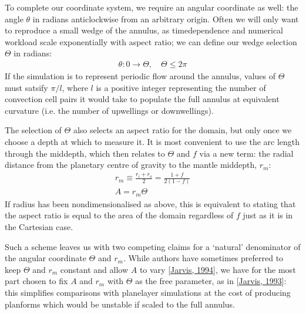 \documentclass[letterpaper,10pt,english]{jupyterBook}
\begin{document}
\sphinxAtStartPar
To complete our coordinate system, we require an angular coordinate as well: the angle \(\theta\) in radians anticlockwise from an arbitrary origin. Often we will only want to reproduce a small wedge of the annulus, as time\sphinxhyphen{}dependence and numerical workload scale exponentially with aspect ratio; we can define our wedge selection \(\Theta\) in radians:
\begin{equation*}
\begin{split} \theta: 0 \to \Theta, \quad \Theta \leq 2\pi \end{split}
\end{equation*}
\sphinxAtStartPar
If the simulation is to represent periodic flow around the annulus, values of \(\Theta\) must satsify \(\pi / l\), where \(l\) is a positive integer representing the number of convection cell pairs it would take to populate the full annulus at equivalent curvature (i.e. the number of upwellings or downwellings).

\sphinxAtStartPar
The selection of \(\Theta\) also selects an aspect ratio for the domain, but only once we choose a depth at which to measure it. It is most convenient to use the arc length through the mid\sphinxhyphen{}depth, which then relates to \(\Theta\) and \(f\) via a new term: the radial distance from the planetary centre of gravity to the mantle mid\sphinxhyphen{}depth, \(r_m\):
\begin{equation*}
\begin{split}
r_m \equiv \frac{r_{i} + r_{o}}{2} = \frac{1 + f}{2 \left( 1 - f \right)} \\
A = r_m \Theta
\end{split}
\end{equation*}
\sphinxAtStartPar
If radius has been non\sphinxhyphen{}dimensionalised as above, this is equivalent to stating that the aspect ratio is equal to the area of the domain \sphinxhyphen{} regardless of \(f\) \sphinxhyphen{} just as it is in the Cartesian case.

\sphinxAtStartPar
Such a scheme leaves us with two competing claims for a ‘natural’ denominator of the angular coordinate \sphinxhyphen{} \(\Theta\) and \(r_m\). While authors have sometimes preferred to keep \(\Theta\) and \(r_m\) constant and allow \(A\) to vary {[}\hyperlink{cite.references:id447}{Jarvis, 1994}{]}, we have for the most part chosen to fix \(A\) and \(r_m\) with \(\Theta\) as the free parameter, as in {[}\hyperlink{cite.references:id442}{Jarvis, 1993}{]}: this simplifies comparisons with plane\sphinxhyphen{}layer simulations at the cost of producing planforms which would be unstable if scaled to the full annulus.
\end{document}
